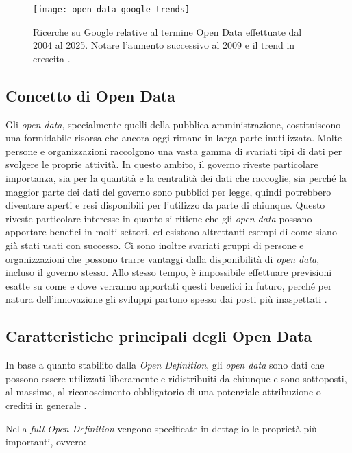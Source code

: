 \begin{figure}[H]
    \centering
    \texttt{[image: open\_data\_google\_trends]}
    \caption[Open Data su Google Trends]{Ricerche su Google relative al termine Open Data effettuate dal 2004 al 2025. Notare l'aumento successivo al 2009 e il trend in crescita \cite{Google_Trends}.}
    \label{fig:open_data_google_trends}
\end{figure}

\subsection{Concetto di Open Data}
Gli \textit{open data}, specialmente quelli della pubblica amministrazione, costituiscono una formidabile risorsa che ancora oggi rimane in larga parte inutilizzata. Molte persone e organizzazioni raccolgono una vasta gamma di svariati tipi di dati per svolgere le proprie attività. In questo ambito, il governo riveste particolare importanza, sia per la quantità e la centralità dei dati che raccoglie, sia perché la maggior parte dei dati del governo sono pubblici per legge, quindi potrebbero diventare aperti e resi disponibili per l'utilizzo da parte di chiunque. Questo riveste particolare interesse in quanto si ritiene che gli \textit{open data} possano apportare benefici in molti settori, ed esistono altrettanti esempi di come siano già stati usati con successo. Ci sono inoltre svariati gruppi di persone e organizzazioni che possono trarre vantaggi dalla disponibilità di \textit{open data}, incluso il governo stesso. Allo stesso tempo, è impossibile effettuare previsioni esatte su come e dove verranno apportati questi benefici in futuro, perché per natura dell'innovazione gli sviluppi partono spesso dai posti più inaspettati \cite{OpenDataHandbook_WhyOpenData}.

\subsection{Caratteristiche principali degli Open Data}
In base a quanto stabilito dalla \textit{Open Definition}, gli \textit{open data} sono dati che possono essere utilizzati liberamente e ridistribuiti da chiunque e sono sottoposti, al massimo, al riconoscimento obbligatorio di una potenziale attribuzione o crediti in generale \cite{OpenDefinition}. 

Nella \textit{full Open Definition} vengono specificate in dettaglio le proprietà più importanti, ovvero:

